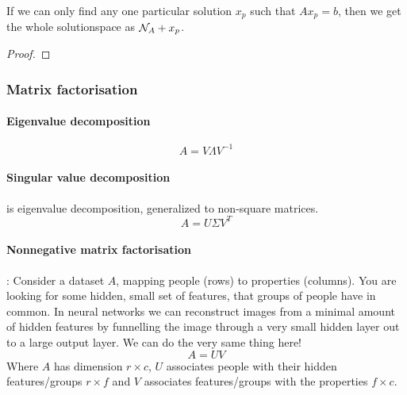 \begin{theorem}
  If we can only find any one particular solution $x_p$ such that $A x_p = b$, then we get the whole solutionspace as $\mathcal{N}_{A} + x_p$.
\end{theorem}

\begin{proof}
\end{proof}





\subsubsection{Matrix factorisation}

\paragraph{Eigenvalue decomposition}
$$ A = V \Lambda V^{-1} $$

\paragraph{Singular value decomposition} is eigenvalue decomposition, generalized to non-square matrices.
$$ A = U \Sigma V^T $$

\paragraph{Nonnegative matrix factorisation}: Consider a dataset $A$, mapping people (rows) to properties (columns). You are looking for some hidden, small set of features, that groups of people have in common. 
In neural networks we can reconstruct images from a minimal amount of hidden features by funnelling the image through a very small hidden layer out to a large output layer. We can do the very same thing here!
$$ A = U V $$
Where $A$ has dimension $r \times c$, $U$ associates people with their hidden features/groups $r \times f$ and $V$ associates features/groups with the properties $f \times c$.
